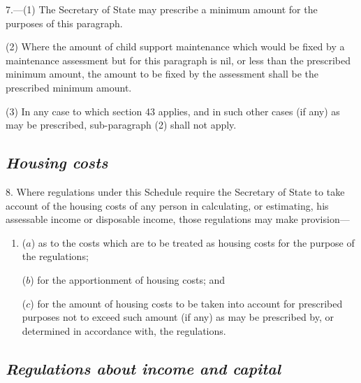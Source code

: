 \documentclass[12pt,a4paper]{article}
\begin{document}
7.---(1) The Secretary of State may prescribe a minimum amount for the purposes of this paragraph.

(2) Where the amount of child support maintenance which would be fixed by a maintenance assessment but for this paragraph is nil, or less than the prescribed minimum amount, the amount to be fixed by the assessment shall be the prescribed minimum amount.

(3) In any case to which section 43 applies, and in such other cases (if any) as may be prescribed, sub-paragraph (2)  shall not apply.

\subsection*{\itshape Housing costs}

8. Where regulations under this Schedule require 
the Secretary of State  %
to take account of the housing costs of any person in calculating, or estimating, his assessable income or disposable income, those regulations may make provision—
\begin{enumerate}\item[]
($a$) as to the costs which are to be treated as housing costs for the purpose of the regulations;

($b$) for the apportionment of housing costs; and

($c$) for the amount of housing costs to be taken into account for prescribed purposes not to exceed such amount (if any) as may be prescribed by, or determined in accordance with, the regulations.
\end{enumerate}


\subsection*{\itshape Regulations about income and capital}
\end{document}
